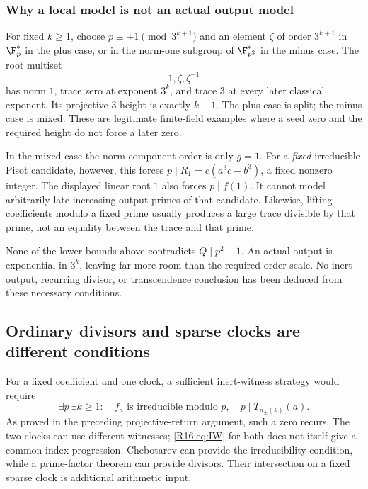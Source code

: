 \documentclass[11pt,a4paper]{article}
\theoremstyle{definition}\newtheorem{definition}[theorem]{Definition}
\theoremstyle{remark}\newtheorem{remark}[theorem]{Remark}
\begin{document}
\subsubsection{Why a local model is not an actual output model}

For fixed $k\ge1$, choose $p\equiv\pm1\pmod{3^{k+1}}$ and an element
$\zeta$ of order $3^{k+1}$ in $\F_p^*$ in the plus case, or in the
norm-one subgroup of $\F_{p^2}^*$ in the minus case. The root multiset
\[
 1,\zeta,\zeta^{-1}
\]
has norm $1$, trace zero at exponent $3^k$, and trace $3$ at every later
classical exponent. Its projective $3$-height is exactly $k+1$.
The plus case is split; the minus case is mixed. These are legitimate
finite-field examples where a seed zero and the required height do not
force a later zero.

In the mixed case the norm-component order is only $g=1$. For a
\emph{fixed} irreducible Pisot candidate, however, this forces
$p\mid R_1=c(a^3c-b^3)$, a fixed nonzero integer. The displayed linear
root $1$ also forces $p\mid f(1)$. It cannot model arbitrarily late
increasing output primes of that candidate. Likewise, lifting coefficients
modulo a fixed prime usually produces a large trace divisible by that
prime, not an equality between the trace and that prime.

None of the lower bounds above contradicts $Q\mid p^2-1$. An actual
output is exponential in $3^k$, leaving far more room than the required
order scale. No inert output, recurring divisor, or transcendence
conclusion has been deduced from these necessary conditions.

\subsection{Ordinary divisors and sparse clocks are different conditions}

For a fixed coefficient and one clock, a sufficient inert-witness strategy
would require
\begin{equation}\label{R16:eq:IW}
 \exists p\ \exists k\ge1:
 \quad f_a\text{ is irreducible modulo }p,
 \quad p\mid T_{n_\pm(k)}(a).
\end{equation}
As proved in the preceding projective-return argument, such a zero recurs. The two clocks can
use different witnesses; \eqref{R16:eq:IW} for both does not itself give a
common index progression. Chebotarev can provide the irreducibility
condition, while a prime-factor theorem can provide divisors. Their
intersection on a fixed sparse clock is additional arithmetic input.
\end{document}

